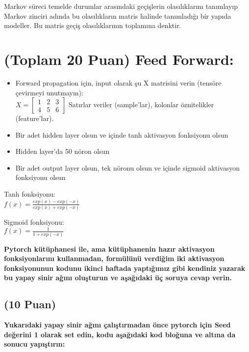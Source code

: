 \documentclass[11pt]{article}
\begin{document}
Markov süreci temelde durumlar arasındaki geçişlerin olasılıklarını tanımlayıp Markov zinciri adında bu olasılıkların matris halinde tanımladığı bir yapıda modeller. Bu matris geçiş olasılıklarının toplamına denktir.


\section{(Toplam 20 Puan) Feed Forward:}
 
\begin{itemize}
    \item Forward propagation için, input olarak şu X matrisini verin (tensöre çevirmeyi unutmayın):\\
    $X = \begin{bmatrix}
        1 & 2 & 3\\
        4 & 5 & 6
        \end{bmatrix}$
    Satırlar veriler (sample'lar), kolonlar öznitelikler (feature'lar).
    \item Bir adet hidden layer olsun ve içinde tanh aktivasyon fonksiyonu olsun
    \item Hidden layer'da 50 nöron olsun
    \item Bir adet output layer olsun, tek nöronu olsun ve içinde sigmoid aktivasyon fonksiyonu olsun
\end{itemize}

Tanh fonksiyonu:\\
$f(x) = \frac{exp(x) - exp(-x)}{exp(x) + exp(-x)}$
\vspace{.2in}

Sigmoid fonksiyonu:\\
$f(x) = \frac{1}{1 + exp(-x)}$

\vspace{.2in}
 \textbf{Pytorch kütüphanesi ile, ama kütüphanenin hazır aktivasyon fonksiyonlarını kullanmadan, formülünü verdiğim iki aktivasyon fonksiyonunun kodunu ikinci haftada yaptığımız gibi kendiniz yazarak bu yapay sinir ağını oluşturun ve aşağıdaki üç soruya cevap verin.}
 
\subsection{(10 Puan)} \textbf{Yukarıdaki yapay sinir ağını çalıştırmadan önce pytorch için Seed değerini 1 olarak set edin, kodu aşağıdaki kod bloğuna ve altına da sonucu yapıştırın:}
\end{document}
